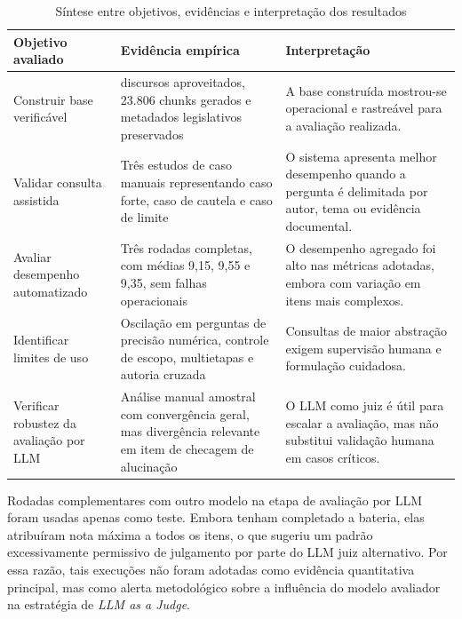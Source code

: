 \begin{table}[t]
\centering
\footnotesize
\caption{Síntese entre objetivos, evidências e interpretação dos resultados}
\label{tab:sintese-objetivos-resultados}
\begin{tabular}{@{}>{\raggedright\arraybackslash}p{}>{\raggedright\arraybackslash}p{}>{\raggedright\arraybackslash}p{}@{}}
\textbf{Objetivo avaliado} & \textbf{Evidência empírica} & \textbf{Interpretação} \\
\hline
Construir base verificável & 15.726 discursos aproveitados, 23.806 chunks gerados e metadados legislativos preservados & A base construída mostrou-se operacional e rastreável para a avaliação realizada. \\
Validar consulta assistida & Três estudos de caso manuais representando caso forte, caso de cautela e caso de limite & O sistema apresenta melhor desempenho quando a pergunta é delimitada por autor, tema ou evidência documental. \\
Avaliar desempenho automatizado & Três rodadas completas, com médias 9,15, 9,55 e 9,35, sem falhas operacionais & O desempenho agregado foi alto nas métricas adotadas, embora com variação em itens mais complexos. \\
Identificar limites de uso & Oscilação em perguntas de precisão numérica, controle de escopo, multietapas e autoria cruzada & Consultas de maior abstração exigem supervisão humana e formulação cuidadosa. \\
Verificar robustez da avaliação por LLM & Análise manual amostral com convergência geral, mas divergência relevante em item de checagem de alucinação & O LLM como juiz é útil para escalar a avaliação, mas não substitui validação humana em casos críticos. \\
\hline
\end{tabular}
\end{table}

Rodadas complementares com outro modelo na etapa de avaliação por LLM foram usadas apenas como teste. Embora tenham completado a bateria, elas atribuíram nota máxima a todos os itens, o que sugeriu um padrão excessivamente permissivo de julgamento por parte do LLM juiz alternativo. Por essa razão, tais execuções não foram adotadas como evidência quantitativa principal, mas como alerta metodológico sobre a influência do modelo avaliador na estratégia de \textit{LLM as a Judge}.

